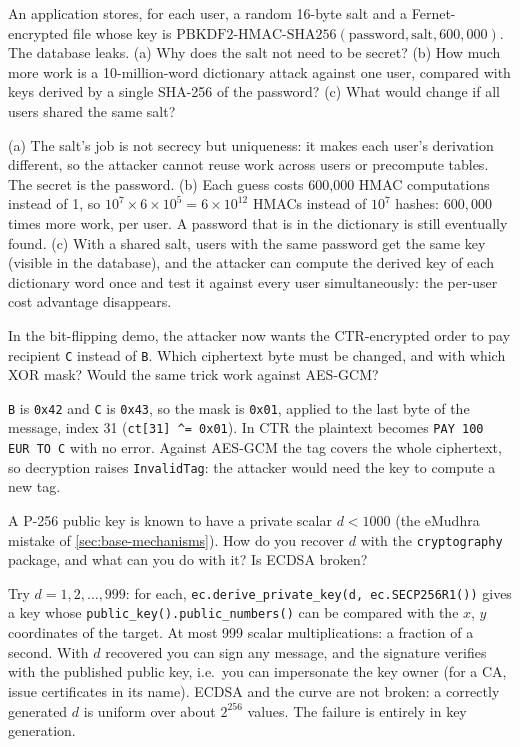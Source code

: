 \begin{exercise}
An application stores, for each user, a random 16-byte salt and a Fernet-encrypted file whose key is $\mathrm{PBKDF2\text{-}HMAC\text{-}SHA256}(\text{password}, \text{salt}, 600{,}000)$. The database leaks. (a) Why does the salt not need to be secret? (b) How much more work is a 10-million-word dictionary attack against one user, compared with keys derived by a single SHA-256 of the password? (c) What would change if all users shared the same salt?
\end{exercise}
\begin{solution}
(a) The salt's job is not secrecy but uniqueness: it makes each user's derivation different, so the attacker cannot reuse work across users or precompute tables. The secret is the password. (b) Each guess costs 600{,}000 HMAC computations instead of 1, so $10^7 \times 6 \times 10^5 = 6 \times 10^{12}$ HMACs instead of $10^7$ hashes: $600{,}000$ times more work, per user. A password that is in the dictionary is still eventually found. (c) With a shared salt, users with the same password get the same key (visible in the database), and the attacker can compute the derived key of each dictionary word once and test it against every user simultaneously: the per-user cost advantage disappears.
\end{solution}

\begin{exercise}
In the bit-flipping demo, the attacker now wants the CTR-encrypted order to pay recipient \texttt{C} instead of \texttt{B}. Which ciphertext byte must be changed, and with which XOR mask? Would the same trick work against AES-GCM?
\end{exercise}
\begin{solution}
\texttt{B} is \texttt{0x42} and \texttt{C} is \texttt{0x43}, so the mask is \texttt{0x01}, applied to the last byte of the message, index 31 (\texttt{ct[31] \textasciicircum= 0x01}). In CTR the plaintext becomes \texttt{PAY 100 EUR TO C} with no error. Against AES-GCM the tag covers the whole ciphertext, so decryption raises \texttt{InvalidTag}: the attacker would need the key to compute a new tag.
\end{solution}

\begin{exercise}
A P-256 public key is known to have a private scalar $d < 1000$ (the eMudhra mistake of \cref{sec:base-mechanisms}). How do you recover $d$ with the \texttt{cryptography} package, and what can you do with it? Is ECDSA broken?
\end{exercise}
\begin{solution}
Try $d = 1, 2, \dots, 999$: for each, \texttt{ec.derive_private_key(d, ec.SECP256R1())} gives a key whose \texttt{public_key().public_numbers()} can be compared with the $x$, $y$ coordinates of the target. At most 999 scalar multiplications: a fraction of a second. With $d$ recovered you can sign any message, and the signature verifies with the published public key, i.e.\ you can impersonate the key owner (for a CA, issue certificates in its name). ECDSA and the curve are not broken: a correctly generated $d$ is uniform over about $2^{256}$ values. The failure is entirely in key generation.
\end{solution}
